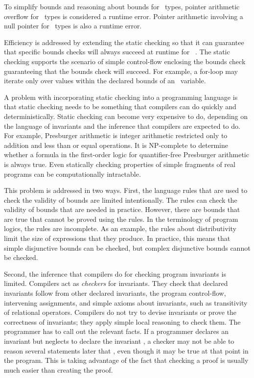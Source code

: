 To simplify bounds and reasoning about bounds for
\arrayptr\ types, pointer arithmetic overflow for \arrayptr\
types is considered a runtime error. Pointer arithmetic involving a null
pointer for \arrayptr\ types is also a runtime error.

Efficiency is addressed by extending the static checking so that it can
guarantee that specific bounds checks will always succeed at runtime for
\arrayptr\ . The static checking
supports the scenario of simple control-flow enclosing the bounds check
guaranteeing that the bounds check will succeed. For example, a for-loop
may iterate only over values within the declared bounds of an
\arrayptr\ variable.

A problem with incorporating static checking into a programming language
is that static checking needs to be something that compilers can do
quickly and deterministically. Static checking can become very expensive
to do, depending on the language of invariants and the inference that
compilers are expected to do. For example, Presburger arithmetic is
integer arithmetic restricted only to addition and less than or equal
operations. It is NP-complete to determine whether a formula in the
first-order logic for quantifier-free Presburger arithmetic is
always true. Even statically checking properties of
simple fragments of real programs can be computationally intractable.

This problem is addressed in two ways. First, the language rules that are
used to check the validity of bounds are limited intentionally.  The rules can
check the validity of bounds that are needed in practice.  However, there are
bounds that are true that cannot be proved using the rules.  In the terminology
of program logics, the rules are incomplete.  As an example, the
rules about distributivity limit the size of
expressions that they produce.   In practice, this means that
simple disjunctive bounds can be checked, but complex disjunctive bounds cannot be checked.

Second, the inference that compilers do for checking program invariants is
limited.  Compilers act as \emph{checkers} for invariants. They check that
declared invariants follow from other declared invariants, the
program control-flow, intervening assignments, and simple axioms about
invariants, such as transitivity of relational operators. Compilers
do not try to devise invariants or prove the correctness of
invariants; they apply simple local reasoning to check them. The
programmer has to call out the relevant facts. If a programmer declares
an invariant \code{x == y} but neglects to declare the invariant
\code{y == z}, a checker may not be able to reason several
statements later that , even though it may be true at
that point in the program. This is taking advantage of the fact that
checking a proof is usually much easier than creating the proof.

